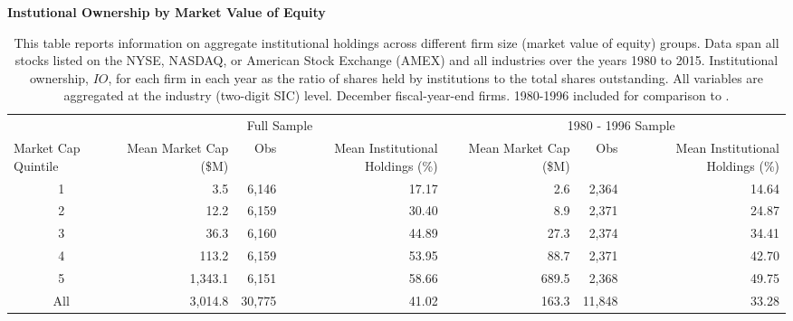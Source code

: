 \begin{table}[H]
\footnotesize
\centering
  \caption{\textbf{Instutional Ownership by Market Value of Equity}}
  \caption*{\footnotesize
  This table reports information on aggregate institutional holdings across different firm size (market value of equity) groups. Data span all stocks listed on the NYSE, NASDAQ, or American Stock Exchange (AMEX) and all industries over the years 1980 to 2015. Institutional ownership, $IO$, for each firm in each year as the ratio of shares held by institutions to the total shares outstanding. All variables are aggregated at the industry (two-digit SIC) level. December fiscal-year-end firms. 1980-1996 included for comparison to \cite{grinsteinmichaely2005}.
  }
\begin{tabular}{lrrrrrrr}
    \toprule
          & \multicolumn{3}{c}{Full Sample} &       & \multicolumn{3}{c}{1980 - 1996 Sample} \\
    \cmidrule{2-4} \cmidrule{6-8}
\multicolumn{1}{L{2cm}}{Market Cap Quintile} & \multicolumn{1}{C{2cm}}{Mean Market Cap (\$M)}& Obs   & \multicolumn{1}{C{2cm}}{Mean Institutional Holdings (\%) }& \multicolumn{1}{c}{} & \multicolumn{1}{C{2cm}}{Mean Market Cap (\$M)} & Obs   & \multicolumn{1}{C{2cm}}{Mean Institutional Holdings (\%)} \\ 
\hline
    \multicolumn{1}{c}{1} & 3.5   & 6,146 & 17.17 & \multicolumn{1}{c}{} & 2.6   & 2,364 & 14.64 \\
    \multicolumn{1}{c}{2} & 12.2  & 6,159 & 30.40 & \multicolumn{1}{c}{} & 8.9   & 2,371 & 24.87 \\
    \multicolumn{1}{c}{3} & 36.3  & 6,160 & 44.89 & \multicolumn{1}{c}{} & 27.3  & 2,374 & 34.41 \\
    \multicolumn{1}{c}{4} & 113.2 & 6,159 & 53.95 & \multicolumn{1}{c}{} & 88.7  & 2,371 & 42.70 \\
    \multicolumn{1}{c}{5} & 1,343.1 & 6,151 & 58.66 & \multicolumn{1}{c}{} & 689.5 & 2,368 & 49.75\\
    \multicolumn{1}{c}{All} & 3,014.8 & 30,775 & 41.02 & \multicolumn{1}{c}{} & 163.3 & 11,848 & 33.28 \\    \bottomrule
    \end{tabular} 
  \label{ior-mve-summary}
\end{table}%
